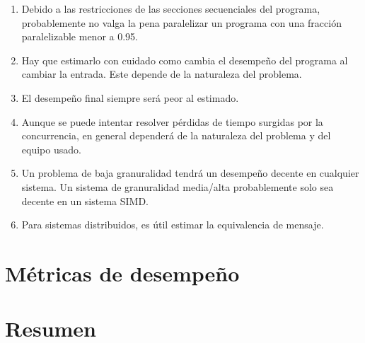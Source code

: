 \begin{enumerate}
    \item Debido a las restricciones de las secciones secuenciales del programa,
    probablemente no valga la pena paralelizar un programa con una fracción
    paralelizable menor a 0.95.
    
    \item Hay que estimarlo con cuidado como cambia el desempeño del programa
    al cambiar la entrada. Este depende de la naturaleza del problema.
    
    \item El desempeño final siempre será peor al estimado.
    
    \item Aunque se puede intentar resolver pérdidas de tiempo surgidas por la
    concurrencia, en general dependerá de la naturaleza del problema y del
    equipo usado.
    
    \item Un problema de baja granuralidad tendrá un desempeño decente en
    cualquier sistema. Un sistema de granuralidad media/alta probablemente solo
    sea decente en un sistema SIMD.
    
    \item Para sistemas distribuidos, es útil estimar la equivalencia de
    mensaje.
    
\end{enumerate}

\section{Métricas de desempeño}

\section{Resumen}
